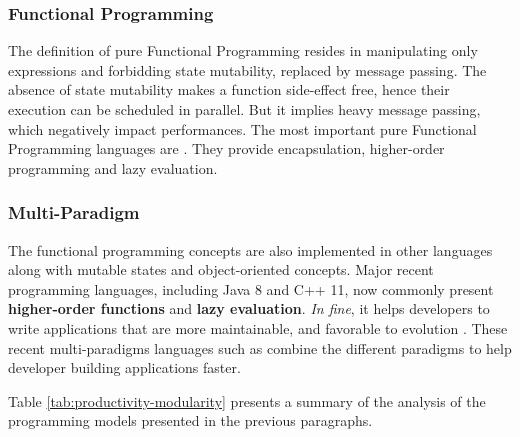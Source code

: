 \subsubsection{Functional Programming} \label{chapter3:software-productivity:programming-models:functional-programming}


The definition of pure Functional Programming resides in manipulating only expressions and forbidding state mutability, replaced by message passing.
The absence of state mutability makes a function side-effect free, hence their execution can be scheduled in parallel.
But it implies heavy message passing, which negatively impact performances.
The most important pure Functional Programming languages are .
They provide encapsulation, higher-order programming and lazy evaluation.

\subsubsection{Multi-Paradigm}

The functional programming concepts are also implemented in other languages along with mutable states and object-oriented concepts.
Major recent programming languages, including Java 8 and C++ 11, now commonly present \textbf{higher-order functions} and \textbf{lazy evaluation}. %
\textit{In fine}, it helps developers to write applications that are more maintainable, and favorable to evolution \cite{Hughes1989,Turner1981}.
These recent multi-paradigms languages such as  combine the different paradigms to help developer building applications faster.

\separator

Table \ref{tab:productivity-modularity} presents a summary of the analysis of the programming models presented in the previous paragraphs.


